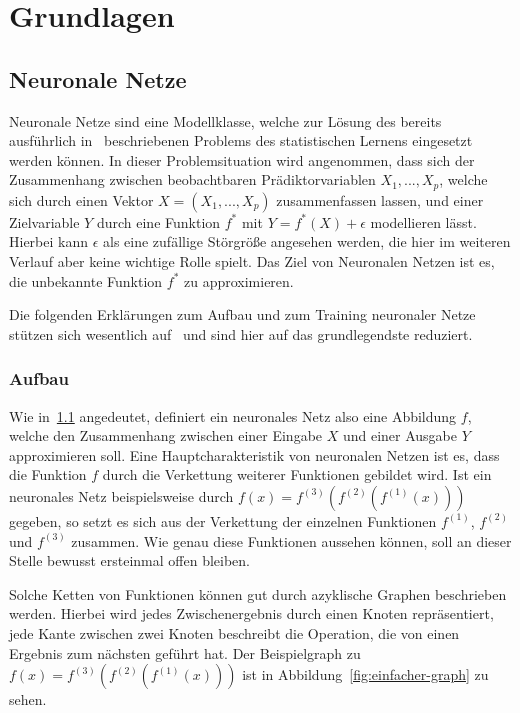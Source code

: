 \section{Grundlagen}
\label{sec:grundlagen}

\subsection{Neuronale Netze}
\label{sec:neuronale-netze}

Neuronale Netze sind eine Modellklasse, welche zur L\"osung des
bereits ausf\"uhrlich
in~\cite{statistical_learning} beschriebenen Problems des statistischen
Lernens eingesetzt werden k\"onnen.
In dieser Problemsituation wird angenommen, dass sich der Zusammenhang zwischen
beobachtbaren Pr\"adiktorvariablen $X_1, ..., X_p$, welche sich durch
einen Vektor $X = (X_1, ..., X_p)$ zusammenfassen lassen, und einer
Zielvariable $Y$ durch eine Funktion $f^*$ mit $Y = f^*(X) + \epsilon$
modellieren l\"asst. Hierbei kann $\epsilon$ als eine zuf\"allige
St\"orgr\"o{\ss}e angesehen werden, die hier im weiteren Verlauf aber
keine wichtige Rolle spielt.
Das Ziel von Neuronalen Netzen ist es, die unbekannte Funktion $f^*$
zu approximieren.

Die folgenden Erkl\"arungen zum Aufbau und zum Training neuronaler Netze
st\"utzen sich wesentlich auf~\cite{Goodfellow-et-al-2016} und sind hier
auf das grundlegendste reduziert.

\subsubsection{Aufbau}

Wie in~\ref{sec:neuronale-netze} angedeutet, definiert ein neuronales Netz
also eine Abbildung $f$, welche den Zusammenhang zwischen einer Eingabe $X$
und einer Ausgabe $Y$ approximieren soll.
Eine Hauptcharakteristik von neuronalen Netzen ist es, dass die Funktion $f$
durch die Verkettung weiterer Funktionen gebildet wird.
Ist ein neuronales Netz beispielsweise durch
$f(x) = f^{(3)}(f^{(2)}(f^{(1)}(x)))$ gegeben, so setzt es sich aus der
Verkettung der einzelnen Funktionen $f^{(1)}$, $f^{(2)}$ und
$f^{(3)}$ zusammen. Wie genau diese Funktionen aussehen k\"onnen, soll an dieser
Stelle bewusst ersteinmal offen bleiben.

Solche Ketten von Funktionen k\"onnen gut durch
azyklische Graphen beschrieben werden. Hierbei wird jedes Zwischenergebnis
durch einen Knoten repr\"asentiert, jede Kante zwischen zwei Knoten beschreibt
die Operation, die von einen Ergebnis zum n\"achsten gef\"uhrt hat.
Der Beispielgraph zu $f(x) = f^{(3)}(f^{(2)}(f^{(1)}(x)))$ ist in
Abbildung~\ref{fig:einfacher-graph} zu sehen.

